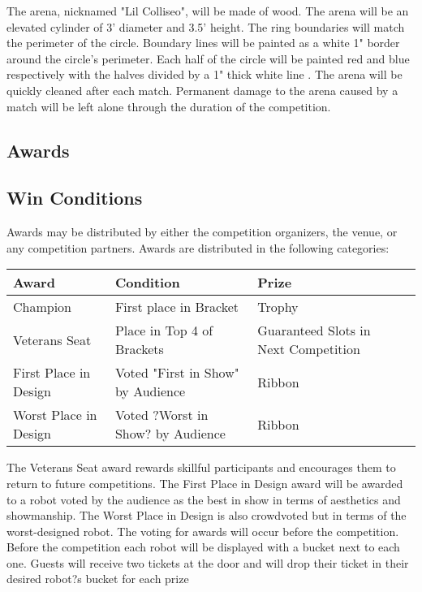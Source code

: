 \documentclass{article}
\begin{document}
            The arena, nicknamed "Lil Colliseo", will be made of wood. The arena will be an elevated cylinder of 3' diameter and 3.5' height. The ring boundaries will match the perimeter of the circle. Boundary lines will be painted as a white 1" border around the circle's perimeter. Each half of the circle will be painted red and blue respectively with the halves divided by a 1" thick white line
		.
            The arena will be quickly cleaned after each match. Permanent damage to the arena caused by a match will be left alone through the duration of the competition.
            		

	\subsection {Awards}	

	\subsection {Win Conditions}	
	
	Awards may be distributed by either the competition organizers, the venue, or any competition partners. Awards are distributed in the following categories:
	
	
\begin{center}
    \begin{tabular}{| l | l | l | l |}
    \hline
    Award & Condition & Prize  \\ \hline
    Champion &  First place in Bracket & Trophy \\ \hline
    Veterans Seat & Place in Top 4 of Brackets & Guaranteed Slots in Next Competition \\ \hline
    First Place in Design & Voted "First in Show" by Audience & Ribbon  \\ \hline
    Worst Place in Design & Voted ?Worst in Show? by Audience  &  Ribbon \\    \hline
    \end{tabular}
\end{center}

The Veterans Seat award rewards skillful participants and encourages them to return to future competitions. The First Place in Design award will be awarded to a robot voted by the audience as the best in show in terms of aesthetics and showmanship. The Worst Place in Design is also crowdvoted but in terms of the worst-designed robot. The voting for awards will occur before the competition. Before the competition each robot will be displayed with a bucket next to each one. Guests will receive two tickets at the door and will drop their ticket in their desired robot?s bucket for each prize
\end{document}

